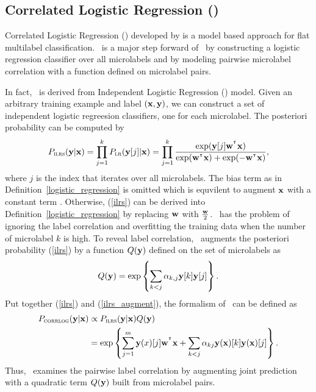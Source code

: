 {%
%
\subsection{Correlated Logistic Regression (\corrlog)} \label{sc_corrlog}

Correlated Logistic Regression (\corrlog) developed by \citet{Bian12corrlog} is a model based approach for flat multilabel classification.
\corrlog\ is a major step forward of \iblr\ by constructing a logistic regression classifier over all microlabels and by modeling pairwise microlabel correlation with a function defined on microlabel pairs.

In fact, \corrlog\ is derived from Independent Logistic Regression (\ilrs) model. 
Given an arbitrary training example and label $(\mathbf {x},\mathbf {y})$, we can construct a set of independent logistic regreesion classifiers, one for each microlabel.
The posteriori probability can be computed by
\begin{align}
	P_{\text{{\sc ilrs}}}(\mathbf {y}|\mathbf {x}) 
	= \prod_{j=1}^{k}P_{\text{{\sc lr}}}(\mathbf {y}[j]|\mathbf {x})
	= \prod_{j=1}^{k}\frac{\exp(\mathbf {y}[j]\mathbf {w}^{^{\intercal}}\mathbf {x})}{\exp(\mathbf {w}^{^{\intercal}}\mathbf {x})+\exp(-\mathbf {w}^{^{\intercal}}\mathbf {x})}, \label{ilrs}
\end{align}
where $j$ is the index that iterates over all microlabels. 
The bias term as in Definition~\ref{logistic_regression} is omitted which is equvilent to augment $\mathbf {x}$ with a constant term \citep{Bian12corrlog}.
Otherwise, (\ref{ilrs}) can be derived into Definition~\ref{logistic_regression} by replacing $\mathbf {w}$ with $\frac{\mathbf {w}}{2}$.
\ilrs\ has the problem of ignoring the label correlation and overfitting the training data when the number of microlabel $k$ is high.
To reveal label correlation, \corrlog\ augments the posteriori probability (\ref{ilrs}) by a function $Q(\mathbf {y})$ defined on the set of microlabels as
\begin{align}
	Q(\mathbf {y}) = \exp\left\{\sum_{k<j}\alpha_{k,j}\mathbf {y}[k]\mathbf {y}[j]\right\}. \label{ilrs_augment}
\end{align}
Put together (\ref{ilrs}) and (\ref{ilrs_augment}), the formalism of \corrlog\ can be defined as
\begin{align*}
	P_{\text{{\sc corrlog}}}(\mathbf {y}|\mathbf {x}) &\propto P_{\text{{\sc ilrs}}}(\mathbf {y}|\mathbf {x}) Q(\mathbf {y}) \\
		&=\exp\left\{ \sum_{j=1}^{m}\mathbf {y}(x)[j]\mathbf {w}^{^{\intercal}}\mathbf {x} + \sum_{k<j}\alpha_{kj}\mathbf {y}(\mathbf {x})[k]\mathbf {y}(\mathbf {x})[j] \right\}.
\end{align*}
Thus, \corrlog\ examines the pairwise label correlation by augmenting joint prediction with a quadratic term $Q(\mathbf {y})$ built from microlabel pairs.



}
